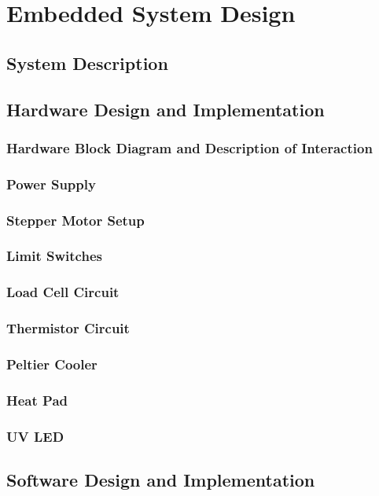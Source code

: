 \chapter{Embedded System Design}

\section{System Description}

\section{Hardware Design and Implementation}
\subsection{Hardware Block Diagram and Description of Interaction}
\subsection{Power Supply}
\subsection{Stepper Motor Setup}
\subsection{Limit Switches}
\subsection{Load Cell Circuit}
\subsection{Thermistor Circuit}
\subsection{Peltier Cooler}
\subsection{Heat Pad}
\subsection{UV LED}

\section{Software Design and Implementation}
